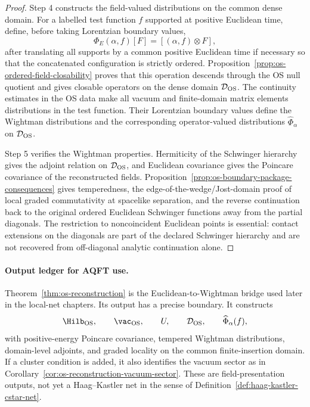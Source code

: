 \begin{proof}
Step 4 constructs the field-valued distributions on the common dense domain.
For a labelled test function \(f\) supported at positive Euclidean time,
define, before taking Lorentzian boundary values,
\[
  \Phi_E(\alpha,f)[F]=[(\alpha,f)\otimes F],
\]
after translating all supports by a common positive Euclidean time if
necessary so that the concatenated configuration is strictly ordered.
Proposition~\ref{prop:os-ordered-field-closability} proves that this
operation descends through the OS null quotient and gives closable operators
on the dense domain \(\mathcal D_{\rm OS}\).  The continuity estimates in the
OS data make all vacuum and finite-domain matrix elements distributions in
the test function.  Their Lorentzian boundary values define the Wightman
distributions and the corresponding operator-valued distributions
\(\widehat\Phi_\alpha\) on \(\mathcal D_{\rm OS}\).

Step 5 verifies the Wightman properties.  Hermiticity of the Schwinger
hierarchy gives the adjoint relation on \(\mathcal D_{\rm OS}\), and
Euclidean covariance gives the Poincare covariance of the reconstructed
fields.  Proposition~\ref{prop:os-boundary-package-consequences} gives
temperedness, the edge-of-the-wedge/Jost-domain proof of local graded
commutativity at spacelike separation, and the reverse continuation back to
the original ordered Euclidean Schwinger functions away from the partial
diagonals.  The restriction to noncoincident Euclidean points is essential:
contact extensions on the diagonals are part of the declared Schwinger
hierarchy and are not recovered from off-diagonal analytic continuation
alone.
\end{proof}

\paragraph{Output ledger for AQFT use.}
Theorem~\ref{thm:os-reconstruction} is the Euclidean-to-Wightman bridge used
later in the local-net chapters.  Its output has a precise boundary.  It
constructs
\[
  \Hilb_{\rm OS},\qquad
  \vac_{\rm OS},\qquad
  U,\qquad
  \mathcal D_{\rm OS},\qquad
  \widehat\Phi_\alpha(f),
\]
with positive-energy Poincare covariance, tempered Wightman distributions,
domain-level adjoints, and graded locality on the common finite-insertion
domain.  If a cluster condition is added, it also identifies the vacuum
sector as in Corollary~\ref{cor:os-reconstruction-vacuum-sector}.  These are
field-presentation outputs, not yet a Haag--Kastler net in the sense of
Definition~\ref{def:haag-kastler-cstar-net}.

